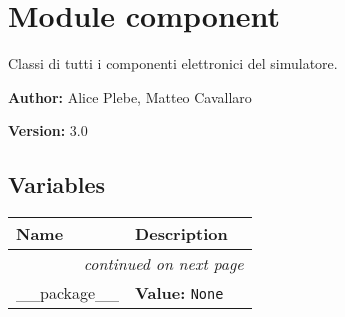 %
%
%


\section{Module component}

    \label{component}
Classi di tutti i componenti elettronici del simulatore.

\textbf{Author:} Alice Plebe, Matteo Cavallaro



\textbf{Version:} 3.0





  \subsection{Variables}

    \vspace{-1cm}
\hspace{\varindent}\begin{longtable}{|p{\varnamewidth}|p{\vardescrwidth}|l}
\cline{1-2}
\cline{1-2} \centering \textbf{Name} & \centering \textbf{Description}& \\
\cline{1-2}
\endhead\cline{1-2}\multicolumn{3}{r}{\small\textit{continued on next page}}\\\endfoot\cline{1-2}
\endlastfoot\raggedright \_\-\_\-p\-a\-c\-k\-a\-g\-e\-\_\-\_\- & \raggedright \textbf{Value:} 
{\tt None}&\\
\cline{1-2}
\end{longtable}



